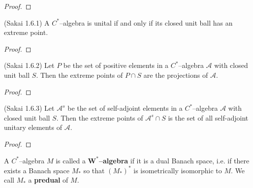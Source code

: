 \begin{proof}
  \leanok
\end{proof}


\begin{theorem}
  \label{thm:cstar_unital_iff_extreme_Sak_1_6_1} (Sakai 1.6.1)
  \leanok
  A $C^{*}$--algebra is unital if and only if its closed unit ball has an extreme point.
\end{theorem}

\begin{proof}
  \leanok
\end{proof}

\begin{proposition}
  \label{prop:extr_pos_projs_Sak_1_6_2} (Sakai 1.6.2)
  \leanok
  Let $P$ be the set of positive elements in a $C^{*}$--algebra $\mathcal{A}$ with closed unit ball $S$. Then the extreme
  points of $P\cap S$ are the projections of $\mathcal{A}$.
\end{proposition}

\begin{proof}
  \leanok
\end{proof}

\begin{proposition}
  \label{prop:extr_sa_sa_unitaries_Sak_1_6_3} (Sakai 1.6.3)
  \leanok
  Let $\mathcal{A}^{s}$ be the set of self-adjoint elements in a $C^{*}$--algebra $\mathcal{A}$ with closed unit ball $S$. Then
  the extreme points of $\mathcal{A}^{s}\cap S$ is the set of all self-adjoint unitary elements of $\mathcal{A}$.
\end{proposition}

\begin{proof}
  \leanok
\end{proof}

\begin{definition}
  \label{def:wstar_def}
  \leanok
  A $C^{*}$--algebra $M$ is called a $\mathbf{W^{*}}$\textbf{--algebra} if it is a dual Banach space, i.e. if there exists a Banach space
  $M_{*}$ so that $(M_{*})^{*}$ is isometrically isomorphic to $M$. We call $M_{*}$ a \textbf{predual} of $M$.
\end{definition}

